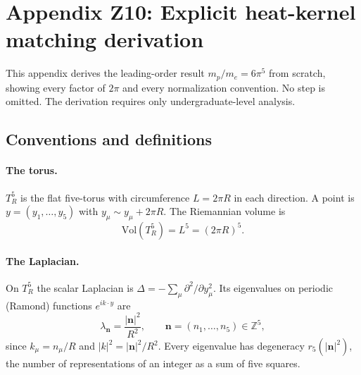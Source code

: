 
\section{Appendix Z10: Explicit heat-kernel matching derivation}
\label{app:explicit}

This appendix derives the leading-order result
$m_p/m_e = 6\pi^5$ from scratch, showing every factor of $2\pi$
and every normalization convention. No step is omitted.
The derivation requires only undergraduate-level analysis.

\subsection{Conventions and definitions}

\paragraph{The torus.}
$T^5_R$ is the flat five-torus with circumference $L = 2\pi R$ in
each direction. A point is $y = (y_1,\ldots,y_5)$ with
$y_\mu \sim y_\mu + 2\pi R$. The Riemannian volume is
\begin{equation}\label{eq:vol}
  \mathrm{Vol}(T^5_R) = L^5 = (2\pi R)^5.
\end{equation}

\paragraph{The Laplacian.}
On $T^5_R$ the scalar Laplacian is $\Delta = -\sum_\mu \partial^2/\partial y_\mu^2$.
Its eigenvalues on periodic (Ramond) functions $e^{i k\cdot y}$ are
\begin{equation}\label{eq:eigenvalues}
  \lambda_{\mathbf{n}} = \frac{|{\mathbf{n}}|^2}{R^2},
  \qquad
  {\mathbf{n}} = (n_1,\ldots,n_5) \in \mathbb{Z}^5,
\end{equation}
since $k_\mu = n_\mu / R$ and $|k|^2 = |\mathbf{n}|^2/R^2$.
Every eigenvalue has degeneracy $r_5(|\mathbf{n}|^2)$, the number of
representations of an integer as a sum of five squares.

